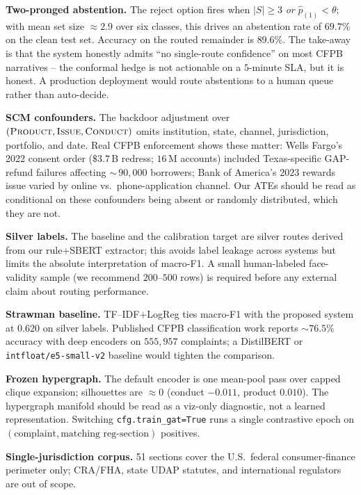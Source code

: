 \documentclass[11pt]{article}
\begin{document}
\textbf{Two-pronged abstention.} The reject option fires when
$|S|\!\geq\!3$ \emph{or} $\hat p_{(1)}\!<\!\theta$; with mean set size
$\approx 2.9$ over six classes, this drives an abstention rate of
$69.7\%$ on the clean test set. Accuracy on the routed remainder is
$89.6\%$. The take-away is that the system honestly admits ``no
single-route confidence'' on most CFPB narratives -- the conformal
hedge is not actionable on a $5$-minute SLA, but it is honest. A
production deployment would route abstentions to a human queue rather
than auto-decide.

\textbf{SCM confounders.} The backdoor adjustment over
$(\textsc{Product}, \textsc{Issue}, \textsc{Conduct})$ omits institution,
state, channel, jurisdiction, portfolio, and date. Real CFPB enforcement
shows these matter: Wells Fargo's 2022 consent order ($\$3.7$\,B redress;
$16$\,M accounts) included Texas-specific GAP-refund failures affecting
$\sim$\,$90{,}000$ borrowers; Bank of America's $2023$ rewards issue
varied by online vs.\ phone-application channel. Our ATEs should be read
as conditional on these confounders being absent or randomly distributed,
which they are not.

\textbf{Silver labels.} The baseline and the calibration target are silver
routes derived from our rule+SBERT extractor; this avoids label leakage
across systems but limits the absolute interpretation of macro-F1. A small
human-labeled face-validity sample (we recommend $200$--$500$ rows) is
required before any external claim about routing performance.

\textbf{Strawman baseline.} TF--IDF$+$LogReg ties macro-F1 with the
proposed system at $0.620$ on silver labels. Published CFPB
classification work reports $\sim 76.5\%$ accuracy with deep encoders on
$555{,}957$ complaints; a DistilBERT or \texttt{intfloat/e5-small-v2}
baseline would tighten the comparison.

\textbf{Frozen hypergraph.} The default encoder is one mean-pool pass
over capped clique expansion; silhouettes are $\approx 0$
(conduct $-0.011$, product $0.010$). The hypergraph manifold should be
read as a viz-only diagnostic, not a learned representation. Switching
\texttt{cfg.train\_gat=True} runs a single contrastive epoch on
$(\text{complaint},\text{matching reg-section})$ positives.

\textbf{Single-jurisdiction corpus.} 51 sections cover the U.S.\ federal
consumer-finance perimeter only; CRA/FHA, state UDAP statutes, and
international regulators are out of scope.
\end{document}
